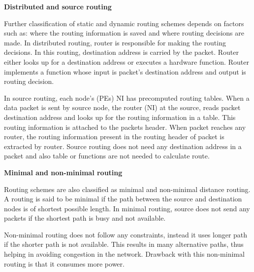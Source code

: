 \vspace{0.5cm}
\noindent\textbf{Distributed and source routing}
\vspace{5mm}

\noindent Further classification of static and dynamic routing schemes depends on factors such as: where the routing information is saved and where routing decisions are made. In distributed routing, router is responsible for making the routing decisions. In this routing, destination address is carried by the packet. Router either looks up for a destination address or executes a hardware function. Router implements a function whose input is packet's destination address and output is routing decision.

In source routing, each node's (PEs) NI has precomputed routing tables. When a data packet is sent by source node, the router (NI) at the source, reads packet destination address and looks up for the routing information in a table. This routing information is attached to the packets header. When packet reaches any router, the routing information present in the routing header of packet is extracted by router. Source routing does not need any destination address in a packet and also table or functions are not needed to calculate route.

\vspace{10mm}
\noindent\textbf{Minimal and non-minimal routing}
\vspace{5mm}

\noindent Routing schemes are also classified as minimal and non-minimal distance routing. A routing is said to be minimal if the path between the source and destination nodes is of shortest possible length. In minimal routing, source does not send any packets if the shortest path is busy and not available. 

Non-minimal routing does not follow any constraints, instead it uses longer path if the shorter path is not available. This results in many alternative paths, thus helping in avoiding congestion in the network. Drawback with this non-minimal routing is that it consumes more power.










 


